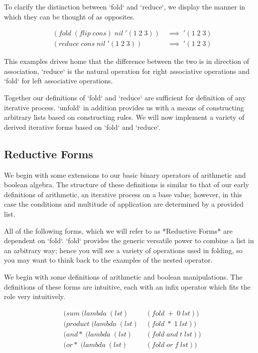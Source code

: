 \documentclass[11pt]{article}
\begin{document}
To clarify the distinction between `fold` and `reduce`, we display the manner in which they can be thought of as opposites.

\begin{align*}
& (fold \; (flip \; cons) \; nil \; '(1 \; 2 \; 3)) \; &\implies \; '(1 \; 2 \; 3)
\\& (reduce \; cons \; nil \; '(1 \; 2 \; 3)) \; &\implies \; '(1 \; 2 \; 3)
\end{align*}

This examples drives home that the difference between the two is in direction of association, `reduce` is the natural operation for right associative operations and `fold` for left associative operations.

Together our definitions of `fold` and `reduce` are sufficient for definition of any iterative process. `unfold` in addition provides us with a means of constructing arbitrary lists based on constructing rules. We will now implement a variety of derived iterative forms based on `fold` and `reduce`.

\subsection{Reductive Forms}
We begin with some extensions to our basic binary operators of arithmetic and boolean algebra. The structure of these definitions is similar to that of our early definitions of arithmetic, an iterative process on a base value; however, in this case the conditions and multitude of application are determined by a provided list.

All of the following forms, which we will refer to as *Reductive Forms* are dependent on `fold`. `fold` provides the generic versatile power to combine a list in an arbitrary way; hence you will see a variety of operations used in folding, so you may want to think back to the examples of the nested operator.

We begin with some definitions of arithmetic and boolean manipulations. The definitions of these forms are intuitive, each with an infix operator which fits the role very intuitively.

\begin{align*}
& (sum \; (lambda \; (lst) \; &(fold \; + \; 0 \; lst))
\\& (product \; (lambda \; (lst) \; &(fold \; * \; 1 \; lst))
\\& (and* \; (lambda \; (lst) \; &(fold \; and \; t \; lst))
\\& (or* \; (lambda \; (lst) \; &(fold \; or \; f \; lst))
\end{align*}
\end{document}

